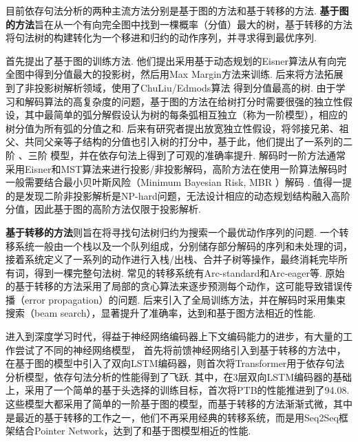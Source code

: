 目前依存句法分析的两种主流方法分别是基于图的方法和基于转移的方法.
\textbf{基于图的方法}旨在从一个有向完全图中找到一棵概率（分值）最大的树，基于转移的方法将句法树的构建转化为一个移进和归约的动作序列，并寻求得到最优序列.

\citet{mcdonald-etal-2005-online}首先提出了基于图的训练方法.
他们提出采用基于动态规划的Eisner算法从有向完全图中得到分值最大的投影树，然后用Max Margin方法来训练.
后来\citet{mcdonald-etal-2005-non}将方法拓展到了非投影树解析领域，使用了ChuLiu/Edmods算法 \citep{chu-1965-shortest}得到分值最高的树.
由于学习和解码算法的高复杂度的问题，基于图的方法在给树打分时需要很强的独立性假设，其中最简单的弧分解假设认为树的每条弧相互独立（称为一阶模型），相应的树分值为所有弧的分值之和.
后来有研究者提出放宽独立性假设，将邻接兄弟、祖父、共同父亲等子结构的分值也引入树的打分中，基于此，他们提出了一系列的二阶 \citep{mcdonald-pereira-2006-online,carreras-2007-experiments}、三阶 \citep{koo-collins-2010-efficient}模型，并在依存句法上得到了可观的准确率提升.
解码时一阶方法通常采用Eisner和MST算法来进行投影/非投影解码，高阶方法在使用一阶算法解码时一般需要结合最小贝叶斯风险（Minimum Bayesian Risk, MBR ）解码 \citep{smith-smith-2007-probabilistic}.
值得一提的是\citet{mcdonald-pereira-2006-online}发现二阶非投影解析是NP-hard问题，无法设计相应的动态规划结构融入高阶分值，因此基于图的高阶方法仅限于投影解析.

\textbf{基于转移的方法}则旨在将寻找句法树归约为搜索一个最优动作序列的问题.
一个转移系统一般由一个栈以及一个队列组成，分别储存部分解码的序列和未处理的词，接着系统定义了一系列的动作进行入栈/出栈、合并子树等操作，最终消耗完毕所有词，得到一棵完整句法树.
常见的转移系统有Arc-standard和Arc-eager等.
原始的基于转移的方法采用了局部的贪心算法来逐步预测每个动作，这可能导致错误传播（error propagation）的问题.
后来\citet{zhang-clark-2008-tale,huang-etal-2009-bilingually}引入了全局训练方法，并在解码时采用集束搜索（beam search），显著提升了准确率，达到和基于图方法相近的性能.

进入到深度学习时代，得益于神经网络编码器上下文编码能力的进步，有大量的工作尝试了不同的神经网络模型，
\citet{chen-manning-2014-fast}首先将前馈神经网络引入到基于转移的方法中，\citet{kiperwasser-goldberg-2016-simple,wang-chang-2016-graph}在基于图的模型中引入了双向LSTM编码器，\citet{li-etal-2019-attentive}则首次将Transformer用于依存句法分析模型，依存句法分析的性能得到了飞跃.
其中，\citet{dozat-etal-2017-biaffine}在3层双向LSTM编码器的基础上，采用了一个简单的基于头选择的训练目标，首次将PTB的性能推进到了94.08.
这些模型大都采用了简单的一阶基于图的模型，而基于转移的方法渐渐式微，其中\citet{ma-etal-2018-stack}是最近的基于转移的工作之一，他们不再采用经典的转移系统，而是用Seq2Seq框架结合Pointer Network，达到了和基于图模型相近的性能.

